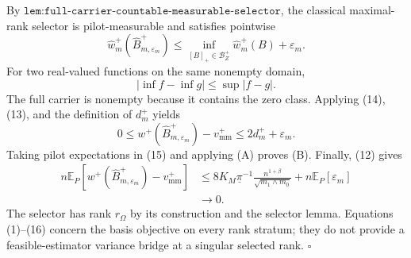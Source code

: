 By \(\texttt{lem:full-carrier-countable-measurable-selector}\), the classical maximal-rank selector is pilot-measurable and satisfies pointwise
\[
\widehat w_m^+(\widehat B_{m,\varepsilon_m}^+)
\le\inf_{[B]_+\in\mathcal B_Z^+}\widehat w_m^+(B)+\varepsilon_m.
\tag{13}
\]
For two real-valued functions on the same nonempty domain,
\[
|\inf f-\inf g|\le\sup|f-g|.
\tag{14}
\]
The full carrier is nonempty because it contains the zero class.  Applying (14), (13), and the definition of \(d_m^+\) yields
\[
0\le w^+(\widehat B_{m,\varepsilon_m}^+)-v_{\mathrm{mm}}^+
\le2d_m^++\varepsilon_m.
\tag{15}
\]
Taking pilot expectations in (15) and applying (A) proves (B).  Finally, (12) gives
\[
\begin{aligned}
n\mathbb E_P\!\left[
w^+(\widehat B_{m,\varepsilon_m}^+)-v_{\mathrm{mm}}^+
\right]
&\le8K_M\underline\pi^{-1}
\frac{n^{1+\beta}}{\sqrt{m_1\wedge m_0}}
+n\mathbb E_P[\varepsilon_m]\\
&\longrightarrow0.
\end{aligned}
\tag{16}
\]
The selector has rank \(r_\Omega\) by its construction and the selector lemma.  Equations (1)--(16) concern the basis objective on every rank stratum; they do not provide a feasible-estimator variance bridge at a singular selected rank. \(\square\)